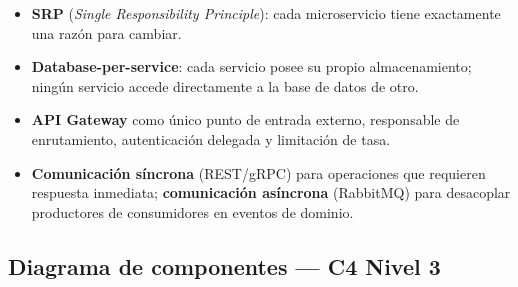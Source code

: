 \documentclass[12pt,a4paper]{article}
\begin{document}
\begin{itemize}
  \item \textbf{SRP} (\emph{Single Responsibility Principle}): cada microservicio
        tiene exactamente una razón para cambiar.
  \item \textbf{Database-per-service}: cada servicio posee su propio almacenamiento;
        ningún servicio accede directamente a la base de datos de otro.
  \item \textbf{API Gateway} como único punto de entrada externo, responsable de
        enrutamiento, autenticación delegada y limitación de tasa.
  \item \textbf{Comunicación síncrona} (REST/gRPC) para operaciones que requieren
        respuesta inmediata; \textbf{comunicación asíncrona} (RabbitMQ) para
        desacoplar productores de consumidores en eventos de dominio.
\end{itemize}

\subsection{Diagrama de componentes — C4 Nivel 3}

\vspace{0.25cm}
\end{document}
